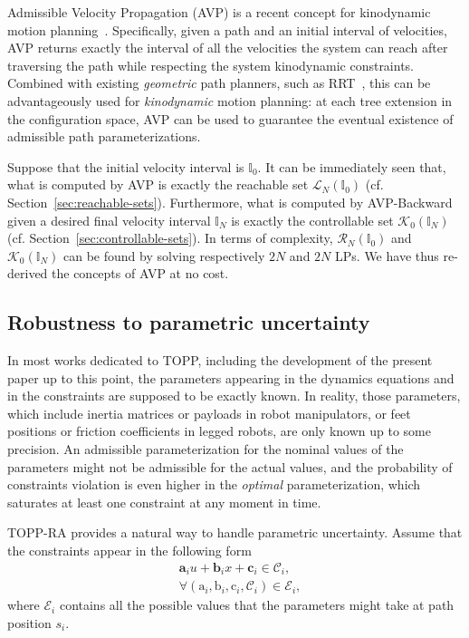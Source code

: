 \documentclass[journal]{IEEEtran}
\theoremstyle{plain}
\theoremstyle{definition}
\theoremstyle{definition}
\renewcommand{\vec}[1]{\bm{\mathrm{#1}}}  %
\newcommand{\cC}{\mathscr{C}}
\newcommand{\calK}{\mathcal{K}}
\newcommand{\bbI}{\mathbb{I}}
\newcommand{\calR}{\mathcal{R}}
\newcommand{\calL}{\mathcal{L}}
\newcommand{\calE}{\mathcal{E}}
\begin{document}
Admissible Velocity Propagation (AVP) is a recent concept for
kinodynamic motion planning~\cite{pham2017admissible}. Specifically,
given a path and an initial interval of velocities, AVP returns
exactly the interval of all the velocities the system can reach after
traversing the path while respecting the system kinodynamic
constraints. Combined with existing \emph{geometric} path planners,
such as RRT~\cite{kuffner2000rrt}, this can be advantageously used for
\emph{kinodynamic} motion planning: at each tree extension in the
configuration space, AVP can be used to guarantee the eventual
existence of admissible path parameterizations.

Suppose that the initial velocity interval is $\bbI_0$. It can be
immediately seen that, what is computed by AVP is exactly the
reachable set $\calL_N(\bbI_0)$
(cf. Section~\ref{sec:reachable-sets}). Furthermore, what is computed
by AVP-Backward~\cite{lertkultanon2014dynamic} given a desired final
velocity interval $\bbI_N$ is exactly the controllable set
$\calK_0(\bbI_N)$ (cf. Section~\ref{sec:controllable-sets}). In terms
of complexity, $\calR_N(\bbI_0)$ and $\calK_0(\bbI_N)$ can be found by
solving respectively $2N$ and $2N$ LPs. We have thus re-derived the
concepts of AVP at no cost.

\subsection{Robustness to parametric uncertainty}
\label{sec:robust-moti-plann}

In most works dedicated to TOPP, including the development of the
present paper up to this point, the parameters appearing in the
dynamics equations and in the constraints are supposed to be exactly
known. In reality, those parameters, which include inertia
matrices or payloads in robot manipulators, or feet positions or
friction coefficients in legged robots, are only known up to some
precision. An admissible parameterization for the nominal values of
the parameters might not be admissible for the actual values, and the
probability of constraints violation is even higher in the \emph{optimal}
parameterization, which saturates at least one constraint at any
moment in time.

TOPP-RA provides a natural way to handle parametric
uncertainty. Assume that the constraints appear in the following form
\begin{equation}
  \label{eq:unc-cnst}
  \begin{aligned}
    &\mathbf{a}_i u + \mathbf{b}_i x+ \mathbf{c}_i \in \cC_i,\\
    &\forall (\vec a_i, \vec b_i, \vec c_i, \cC_i) \in \calE_i,
  \end{aligned}
\end{equation}
where $\calE_i$ contains all the possible values that the parameters
might take at path position $s_i$.
\end{document}
